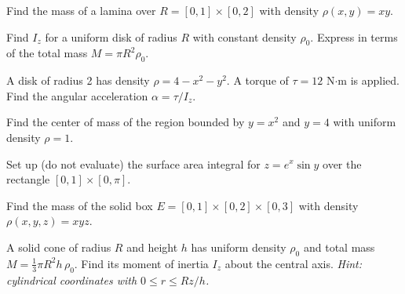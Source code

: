 \documentclass[11pt]{article}
\begin{document}

\begin{practice}

\prob Find the mass of a lamina over $R = [0,1]\times[0,2]$ with density $\rho(x,y) = xy$.


\vspace{3cm}

\prob Find $I_z$ for a uniform disk of radius $R$ with constant density $\rho_0$. Express in terms of the total mass $M = \pi R^2\rho_0$.


\vspace{4cm}

\prob A disk of radius 2 has density $\rho = 4-x^2-y^2$. A torque of $\tau = 12$ N$\cdot$m is applied. Find the angular acceleration $\alpha = \tau/I_z$.


\vspace{5cm}

\prob Find the center of mass of the region bounded by $y = x^2$ and $y = 4$ with uniform density $\rho = 1$.


\vspace{5cm}

\prob Set up (do not evaluate) the surface area integral for $z = e^{x}\sin y$ over the rectangle $[0,1]\times[0,\pi]$.


\vspace{3cm}

\prob Find the mass of the solid box $E = [0,1]\times[0,2]\times[0,3]$ with density $\rho(x,y,z) = xyz$.


\vspace{3cm}

\prob A solid cone of radius $R$ and height $h$ has uniform density $\rho_0$ and total mass $M=\tfrac{1}{3}\pi R^2 h\,\rho_0$. Find its moment of inertia $I_z$ about the central axis. \textit{Hint: cylindrical coordinates with $0 \le r \le Rz/h$.}


\end{practice}
\end{document}
